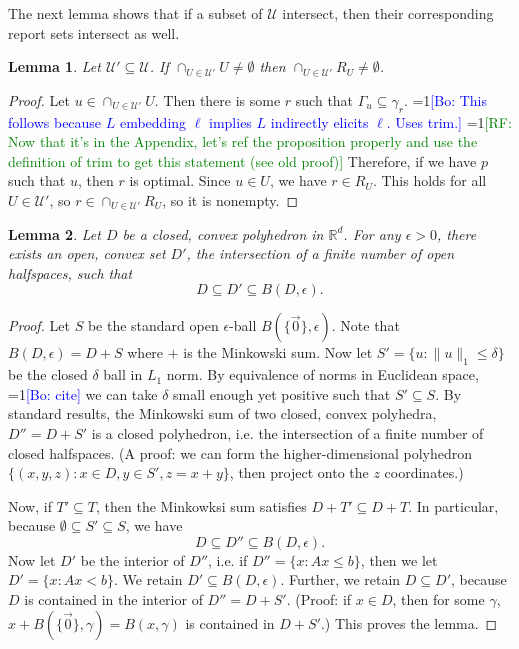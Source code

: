 \documentclass[12pt]{article}
\newcommand{\Comments}{1}
\newcommand{\mynote}[2]{\ifnum\Comments=1\textcolor{#1}{#2}\fi}
\newcommand{\raf}[1]{\mynote{green}{[RF: #1]}}
\newcommand{\bo}[1]{\mynote{blue}{[Bo: #1]}}
\newcommand{\reals}{\mathbb{R}}
\newcommand{\U}{\mathcal{U}}
\newtheorem{lemma}{Lemma}
\begin{document}
The next lemma shows that if a subset of $\U$ intersect, then their corresponding report sets intersect as well.
\begin{lemma} \label{lemma:calibrated-pos}
  Let $\U' \subseteq \U$.
  If $\cap_{U\in\U'} U \neq \emptyset$ then $\cap_{U\in\U'} R_U \neq \emptyset$.
\end{lemma}
\begin{proof}
  Let $u \in \cap_{U\in\U'} U$.
  Then there is some $r$ such that $\Gamma_u \subseteq \gamma_r$. \bo{This follows because $L$ embedding $\ell$ implies $L$ indirectly elicits $\ell$. Uses trim.}
  \raf{Now that it's in the Appendix, let's ref the proposition properly and use the definition of trim to get this statement (see old proof)}
  Therefore, if we have $p$ such that $u$, then $r$ is optimal.
  Since $u \in U$, we have $r \in R_U$.
  This holds for all $U \in \U'$, so $r \in \cap_{U\in\U'} R_U$, so it is nonempty.
\end{proof}

\begin{lemma} \label{lemma:enclose-halfspaces}
  Let $D$ be a closed, convex polyhedron in $\reals^d$.
  For any $\epsilon > 0$, there exists an \emph{open}, convex set $D'$, the intersection of a finite number of open halfspaces, such that
    \[ D \subseteq D' \subseteq B(D,\epsilon) . \]
\end{lemma}
\begin{proof}
  Let $S$ be the standard open $\epsilon$-ball $B(\{\vec{0}\},\epsilon)$.
  Note that $B(D,\epsilon) = D + S$ where $+$ is the Minkowski sum.
  Now let $S' = \{u : \|u\|_1 \leq \delta\}$ be the closed $\delta$ ball in $L_1$ norm.
  By equivalence of norms in Euclidean space, \bo{cite} we can take $\delta$ small enough yet positive such that $S' \subseteq S$.
  By standard results, the Minkowski sum of two closed, convex polyhedra, $D'' = D + S'$ is a closed polyhedron, i.e. the intersection of a finite number of closed halfspaces. (A proof: we can form the higher-dimensional polyhedron $\{(x,y,z) : x \in D, y \in S', z = x+y\}$, then project onto the $z$ coordinates.)

  Now, if $T' \subseteq T$, then the Minkowksi sum satisfies $D + T' \subseteq D + T$.
  In particular, because $\emptyset \subseteq S' \subseteq S$, we have
    \[ D \subseteq D'' \subseteq B(D,\epsilon) . \]
  Now let $D'$ be the interior of $D''$, i.e. if $D'' = \{x : Ax \leq b\}$, then we let $D' = \{x: Ax < b\}$.
  We retain $D' \subseteq B(D,\epsilon)$.
  Further, we retain $D \subseteq D'$, because $D$ is contained in the interior of $D'' = D + S'$.
  (Proof: if $x \in D$, then for some $\gamma$, $x + B(\{\vec{0}\},\gamma) = B(x,\gamma)$ is contained in $D + S'$.)
  This proves the lemma.
\end{proof}
\end{document}

